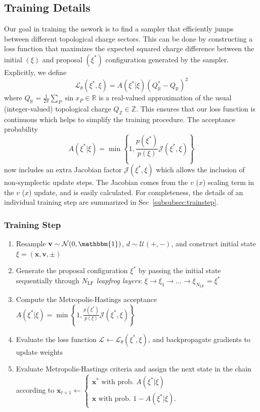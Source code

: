 \documentclass[a4paper,11pt]{article}
\newcommand{\x}{\mathbf{x}}
\newcommand{\p}{\mathbf{v}}
\begin{document}
\subsection{\label{subsec:training}Training Details}
%
Our goal in training the nework is to find a sampler that efficiently
jumps between different topological charge sectors.
%
This can be done by constructing a loss function that maximizes the expected
squared charge difference between the initial \((\xi)\) and proposal
\((\xi^{\ast})\) configuration generated by the sampler.
%
Explicitly, we define
%
\begin{equation}
    \mathcal{L}_{\theta}(\xi^{\ast}, \xi)
    = A(\xi^{\ast}|\xi) (Q^{\ast}_{\mathbb{R}} - Q_{\mathbb{R}})^{2}
\end{equation}
%
where \(Q_{\mathbb{R}} = \frac{1}{2\pi}\sum_{P} \sin x_{P} \in \mathbb{R}\) is
a real-valued approximation of the usual (integer-valued) topological charge
\(Q_{\mathbb{Z}} \in \mathbb{Z}\).
%
This ensures that our loss function is continuous which helps to simplify the
training procedure.
%
The acceptance probability
%
\begin{equation}
A(\xi^{\ast} | \xi) =
\min\left\{1, \frac{p(\xi^{\ast})}{p(\xi)} \mathcal{J}(\xi^{\ast},\xi) \right\}
\end{equation}
%
now includes an extra Jacobian factor $\mathcal{J}(\xi^{\ast},\xi)$
which allows the inclusion of non-symplectic update steps.
The Jacobian comes from the $v$ ($x$) scaling term in the $v$ ($x$) update, and
is easily calculated.
%
For completeness, the details of an individual training step are summarized in
Sec~\ref{subsubsec:trainstep}.
%
\subsubsection{\label{subsubsec:trainstep}Training Step}
%
\begin{enumerate}
    \item Resample \(\p \sim \mathcal{N} (0, \mathbbm{1})\),
        \(d \sim \mathcal{U} (+, -)\), and construct initial state
        \(\xi = (\x, \p, \pm)\)
    \item Generate the proposal configuration \(\xi^{\ast}\) by passing the
        initial state sequentially through \(N_{\mathrm{LF}}\) \emph{leapfrog
        layers}: \(\xi \rightarrow \xi_{1}
        \rightarrow \ldots \rightarrow \xi_{N_{\mathrm{LF}}} = \xi^{\ast}\)
    \item Compute the Metropolis-Hastings acceptance \(A(\xi^{\ast} | \xi) =
      \min\left\{1, \frac{p(\xi^{\ast})}{p(\xi)}
      \mathcal{J}(\xi^{\ast},\xi) \right\}\)
    \item Evaluate the loss function \(\mathcal{L} \leftarrow
        \mathcal{L}_{\theta}(\xi^{\ast}, \xi)\), and backpropagate gradients to
        update weights
    \item Evaluate Metropolis-Hastings criteria and assign the next state in
        the chain according to
        \(\x_{t+1} \leftarrow \begin{cases}%
            \x^{\ast} \text{ with prob. } A(\xi^{\ast}|\xi) \\
            \x \text{ with prob. } 1 - A(\xi^{\ast}|\xi).
        \end{cases}\)
\end{enumerate}
%
\end{document}
